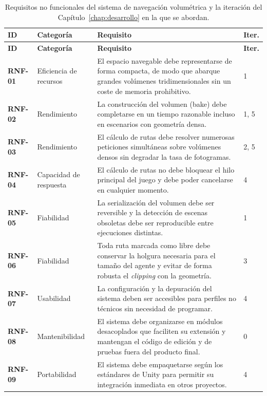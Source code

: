 \renewcommand{\arraystretch}{1.3}
\begin{longtable}{@{}p{1.6cm} p{2.5cm} p{6.4cm} p{1.3cm}@{}}
\caption{Requisitos no funcionales del sistema de navegación volumétrica y la iteración del Capítulo~\ref{chap:desarrollo} en la que se abordan.}
\label{tab:rnf} \\
\rowcolor{udcpink!25}
\textbf{ID} & \textbf{Categoría} & \textbf{Requisito} & \textbf{Iter.} \\
\hline
\endfirsthead
\rowcolor{udcpink!25}
\textbf{ID} & \textbf{Categoría} & \textbf{Requisito} & \textbf{Iter.} \\
\hline
\endhead
\textbf{RNF-01} & Eficiencia de recursos & El espacio navegable debe representarse de forma compacta, de modo que abarque grandes volúmenes tridimensionales sin un coste de memoria prohibitivo. & 1 \\
\hline
\textbf{RNF-02} & Rendimiento & La construcción del volumen (\gls{bake}) debe completarse en un tiempo razonable incluso en escenarios con geometría densa. & 1, 5 \\
\hline
\textbf{RNF-03} & Rendimiento & El cálculo de rutas debe resolver numerosas peticiones simultáneas sobre volúmenes densos sin degradar la tasa de fotogramas. & 2, 5 \\
\hline
\textbf{RNF-04} & Capacidad de respuesta & El cálculo de rutas no debe bloquear el hilo principal del juego y debe poder cancelarse en cualquier momento. & 4 \\
\hline
\textbf{RNF-05} & Fiabilidad & La serialización del volumen debe ser reversible y la detección de escenas obsoletas debe ser reproducible entre ejecuciones distintas. & 1 \\
\hline
\textbf{RNF-06} & Fiabilidad & Toda ruta marcada como libre debe conservar la holgura necesaria para el tamaño del agente y evitar de forma robusta el \textit{clipping} con la geometría. & 3 \\
\hline
\textbf{RNF-07} & Usabilidad & La configuración y la depuración del sistema deben ser accesibles para perfiles no técnicos sin necesidad de programar. & 4 \\
\hline
\textbf{RNF-08} & Mantenibilidad & El sistema debe organizarse en módulos desacoplados que faciliten su extensión y mantengan el código de edición y de pruebas fuera del producto final. & 0 \\
\hline
\textbf{RNF-09} & Portabilidad & El sistema debe empaquetarse según los estándares de Unity para permitir su integración inmediata en otros proyectos. & 4 \\
\hline
\end{longtable}
\renewcommand{\arraystretch}{1.0}
